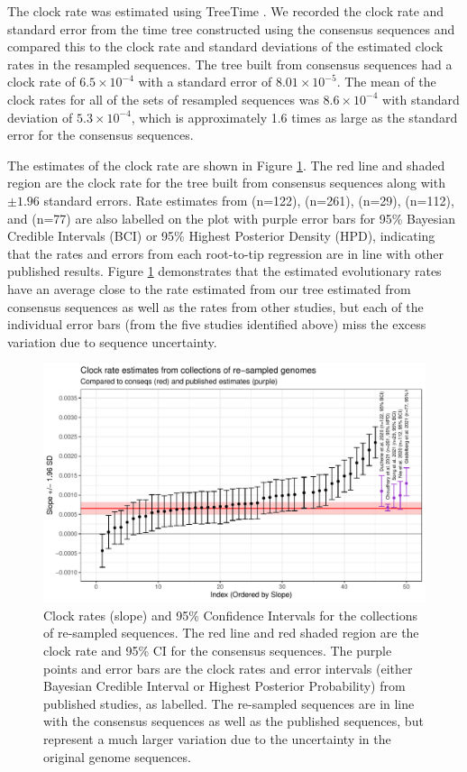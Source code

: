 \documentclass[12pt]{article}
\begin{document}
The clock rate was estimated using TreeTime \cite{sagulenkoTreeTimeMaximumlikelihoodPhylodynamic2018}.
We recorded the clock rate and standard error from the time tree constructed using the consensus sequences and compared this to the clock rate and standard deviations of the estimated clock rates in the resampled sequences.
The tree built from consensus sequences had a clock rate of $6.5\times 10^{-4}$ with a standard error of $8.01\times 10^{-5}$.
The mean of the clock rates for all of the sets of resampled sequences was $8.6\times 10^{-4}$ with standard deviation of $5.3\times 10^{-4}$, which is approximately 1.6 times as large as the standard error for the consensus sequences.


The estimates of the clock rate are shown in Figure \ref{fig:RTT_slope}.
The red line and shaded region are the clock rate for the tree built from consensus sequences along with $\pm 1.96$ standard errors.
Rate estimates from \cite{ducheneTemporalSignalPhylodynamic2020} (n=122), \cite{choudharySevereAcuteRespiratory2021} (n=261), \cite{songGenomicEpidemiologySARSCoV22021} (n=29), \cite{niePhylogeneticPhylodynamicAnalyses2020} (n=112), and \cite{geidelbergGenomicEpidemiologyDensely2021} (n=77) are also labelled on the plot with purple error bars for 95\% Bayesian Credible Intervals (BCI) or 95\% Highest Posterior Density (HPD), indicating that the rates and errors from each root-to-tip regression are in line with other published results.
Figure \ref{fig:RTT_slope} demonstrates that the estimated evolutionary rates have an average close to the rate estimated from our tree estimated from consensus sequences as well as the rates from other studies, but each of the individual error bars (from the five studies identified above) miss the excess variation due to sequence uncertainty.


\begin{figure}[btp]
\centering
\includegraphics[width=0.85\linewidth]{figs/RTT_Slope.pdf}
\caption{\label{fig:RTT_slope}Clock rates (slope) and 95\% Confidence Intervals for the collections of re-sampled sequences.
The red line and red shaded region are the clock rate and 95\% CI for the consensus sequences.
The purple points and error bars are the clock rates and error intervals (either Bayesian Credible Interval or Highest Posterior Probability) from published studies, as labelled.
The re-sampled sequences are in line with the consensus sequences as well as the published sequences, but represent a much larger variation due to the uncertainty in the original genome sequences.}
\end{figure}
\end{document}
